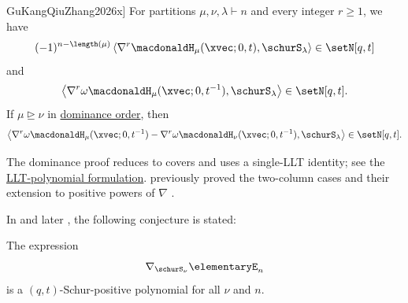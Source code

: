 \begin{theorem}[Gu--Kang--Qiu--Zhang,
\cite[Cor.~18, Thm.~8, and Cor.~9]{GuKangQiuZhang2026x}]
For partitions $\mu,\nu,\lambda\vdash n$ and every integer $r\geq1$, we have
\[
(-1)^{n-\length(\mu)}
\left\langle \nabla^r\macdonaldH_\mu(\xvec;0,t),
\schurS_\lambda\right\rangle
\in\setN[q,t]
\]
and
\[
\left\langle \nabla^r\omega
\macdonaldH_\mu(\xvec;0,t^{-1}),\schurS_\lambda\right\rangle
\in\setN[q,t].
\]
If $\mu\trianglerighteq\nu$ in
\hyperref[dominanceOrder]{dominance order}, then
\[
\left\langle
\nabla^r\omega\macdonaldH_\mu(\xvec;0,t^{-1})
-\nabla^r\omega\macdonaldH_\nu(\xvec;0,t^{-1}),
\schurS_\lambda
\right\rangle
\in\setN[q,t].
\]
\end{theorem}

The dominance proof reduces to covers and uses a single-LLT identity; see the
\hyperref[lltNablaHallLittlewoodCovers]{LLT-polynomial formulation}.
 previously proved the two-column cases and their extension
to positive powers of $\nabla$ \cite{Qu2026xHallLittlewood}.



In \cite{BergeronGarsiaHaimanTesler1999} and later \cite[Conj.~3.20]{Haiman2002},
the following conjecture is stated:
\begin{conjecture}
The expression
\[
\nabla_{\schurS_\nu} \elementaryE_n
\]
is a $(q,t)$-Schur-positive polynomial for all $\nu$ and $n$.
\end{conjecture}
